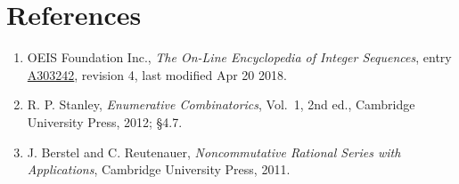 \documentclass[11pt]{article}
\theoremstyle{definition}
\begin{document}
\section{References}

\begin{enumerate}

\item OEIS Foundation Inc., \emph{The On-Line Encyclopedia of Integer Sequences}, entry \href{https://oeis.org/A303242}{A303242}, revision 4, last modified Apr 20 2018.

\item R. P. Stanley, \emph{Enumerative Combinatorics}, Vol.~1, 2nd ed., Cambridge University Press, 2012; \S4.7.

\item J. Berstel and C. Reutenauer, \emph{Noncommutative Rational Series with Applications}, Cambridge University Press, 2011.

\end{enumerate}
\end{document}
